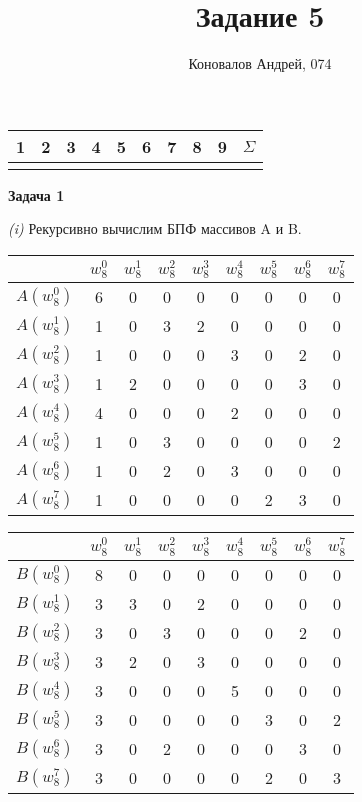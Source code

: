 \documentclass[10pt]{article}
\title{Задание 5}
\author{Коновалов Андрей, 074}
\date{}
\begin{document}
\maketitle

\noindent
\begin{tabularx}{\textwidth}{|C|C|C|C|C|C|C|C|C|C|}
   & 2 & 3 & 4 & 5 & 6 & 7 & 8 & 9 & $\Sigma$ \\
  \hline
  &&&&&&&&& \\
  \hline
\end{tabularx}

\bigskip

{\bf Задача 1}

{\it (i)}
Рекурсивно вычислим БПФ массивов A и B.

\smallskip

\noindent
\begin{tabularx}{\textwidth}{|C|C|C|C|C|C|C|C|C|}
  \hline
  & $w^0_8$ & $w^1_8$ & $w^2_8$ & $w^3_8$ & $w^4_8$ & $w^5_8$ & $w^6_8$ & $w^7_8$ \\
  \hline
  $A(w_8^0)$ & 6 & 0 & 0 & 0 & 0 & 0 & 0 & 0\\
  \hline
  $A(w_8^1)$ & 1 & 0 & 3 & 2 & 0 & 0 & 0 & 0\\
  \hline
  $A(w_8^2)$ & 1 & 0 & 0 & 0 & 3 & 0 & 2 & 0\\
  \hline
  $A(w_8^3)$ & 1 & 2 & 0 & 0 & 0 & 0 & 3 & 0\\
  \hline
  $A(w_8^4)$ & 4 & 0 & 0 & 0 & 2 & 0 & 0 & 0\\
  \hline
  $A(w_8^5)$ & 1 & 0 & 3 & 0 & 0 & 0 & 0 & 2\\
  \hline
  $A(w_8^6)$ & 1 & 0 & 2 & 0 & 3 & 0 & 0 & 0\\
  \hline
  $A(w_8^7)$ & 1 & 0 & 0 & 0 & 0 & 2 & 3 & 0\\
  \hline
\end{tabularx}

\smallskip

\noindent
\begin{tabularx}{\textwidth}{|C|C|C|C|C|C|C|C|C|}
  \hline
  & $w^0_8$ & $w^1_8$ & $w^2_8$ & $w^3_8$ & $w^4_8$ & $w^5_8$ & $w^6_8$ & $w^7_8$ \\
  \hline
  $B(w_8^0)$ & 8 & 0 & 0 & 0 & 0 & 0 & 0 & 0\\
  \hline
  $B(w_8^1)$ & 3 & 3 & 0 & 2 & 0 & 0 & 0 & 0\\
  \hline
  $B(w_8^2)$ & 3 & 0 & 3 & 0 & 0 & 0 & 2 & 0\\
  \hline
  $B(w_8^3)$ & 3 & 2 & 0 & 3 & 0 & 0 & 0 & 0\\
  \hline
  $B(w_8^4)$ & 3 & 0 & 0 & 0 & 5 & 0 & 0 & 0\\
  \hline
  $B(w_8^5)$ & 3 & 0 & 0 & 0 & 0 & 3 & 0 & 2\\
  \hline
  $B(w_8^6)$ & 3 & 0 & 2 & 0 & 0 & 0 & 3 & 0\\
  \hline
  $B(w_8^7)$ & 3 & 0 & 0 & 0 & 0 & 2 & 0 & 3\\
  \hline
\end{tabularx}
\end{document}

